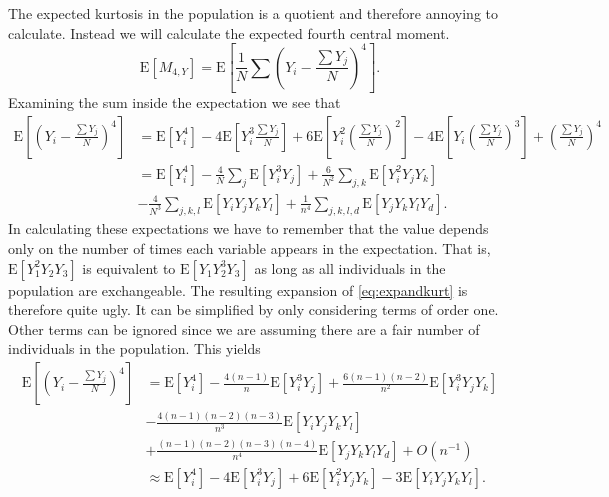 \documentclass{article}
\newcommand{\E}{\mathrm{E}}
\begin{document}
The expected kurtosis in the population is a quotient and therefore annoying to
calculate. Instead we will calculate the expected fourth central moment. 
\begin{equation}
  \E[M_{4,Y}] = \E\left[\frac{1}{N} \sum \left( Y_i - \frac{\sum Y_j}{N} \right)^4 \right].
\end{equation}
Examining the sum inside the expectation we see that 
\begin{align}
  \label{eq:expandkurt}
  \E\left[ \left( Y_i - \frac{\sum Y_j}{N} \right)^4 \right] &= \E[Y_i^4] - 
                                                              4\E\left[ Y_i^3 \frac{\sum Y_j}{N} \right] + 
                                                              6\E\left[Y_i^2\left(\frac{\sum Y_j}{N}\right)^2\right] - 
                                                              4\E\left[Y_i\left(\frac{\sum Y_j}{N}\right)^3\right]+ 
                                                              \left(\frac{\sum Y_j}{N}\right)^4 \nonumber \\
                                                            &= \E[Y_i^4] - 
                                                              \frac{4}{N}\sum_j \E[Y_i^3Y_j] + 
                                                              \frac{6}{N^2}\sum_{j,k} \E[Y_i^2Y_jY_k] \nonumber\\
                                                              &-\frac{4}{N^3}\sum_{j,k,l}\E[Y_iY_jY_kY_l] + 
                                                              \frac{1}{n^4}\sum_{j,k,l,d}\E[Y_jY_kY_lY_d].
\end{align}
In calculating these expectations we have to remember that the value depends
only on the number of times each variable appears in the expectation. That is,
$\E[Y_1^2Y_2Y_3]$ is equivalent to $\E[Y_1Y_2^3Y_3]$ as long as all individuals in
the population are exchangeable. The resulting expansion of
\eqref{eq:expandkurt} is therefore quite ugly. It can be simplified by only
considering terms of order one. Other terms can be ignored since we are
assuming there are a fair number of individuals in the population. This yields
\begin{align}
  \label{eq:popkurt}
  \E\left[ \left( Y_i - \frac{\sum Y_j}{N} \right)^4 \right] &=
  \E[Y_i^4]  - \frac{4(n-1)}{n}\E[Y_i^3Y_j] + \frac{6(n-1)(n-2)}{n^2}\E[Y_i^3Y_jY_k]  \nonumber \\
  &- \frac{4(n-1)(n-2)(n-3)}{n^3}\E[Y_iY_jY_kY_l] \nonumber \\
  &+ \frac{(n-1)(n-2)(n-3)(n-4)}{n^4}\E[Y_jY_kY_lY_d]
  + O(n^{-1}) \nonumber \\
  &\approx \E[Y_i^4]  - 4\E[Y_i^3Y_j] + 6\E[Y_i^2Y_jY_k] - 3\E[Y_iY_jY_kY_l].
\end{align}
\end{document}
